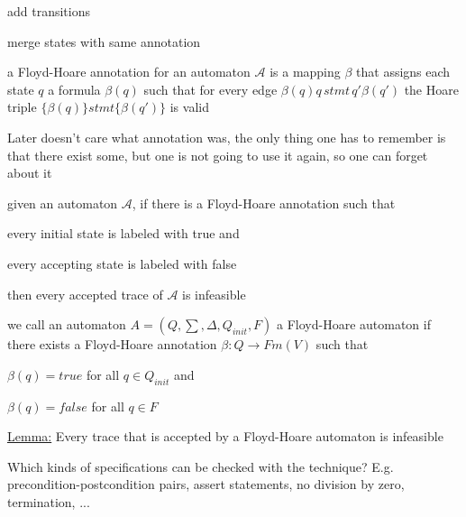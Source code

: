 \documentclass[a4paper]{article}
\begin{document}
\begin{minipage}[t]{0.16\linewidth}
\begin{betterlist}
{{\begin{betterlist}
\begin{enumerate}
					\end{enumerate}
					\begin{betterlist}
						\item a \alert{Floyd-Hoare annotation} for an automaton $\mathcal{A}$ is a mapping $\beta$ that assigns each state $q$ a formula $\beta(q)$ such that for every edge $\beta (q)q\, stmt\, q'\beta(q')$ the Hoare triple $\{\beta(q)\} stmt \{\beta(q′)\}$ is valid
						\begin{betterlist}
							\item Later doesn't care what annotation was, the only thing one has to remember is that there exist some, but one is not going to use it again, so one can forget about it
						\end{betterlist}
						\item given an automaton $\mathcal{A}$, if there is a Floyd-Hoare annotation such that
						\begin{betterlist}
							\item every initial state is labeled with true and
							\item every accepting state is labeled with false
						\end{betterlist}
						then every accepted trace of $\mathcal{A}$ is infeasible
						\item we call an automaton $A = (Q, \sum , \Delta , Q_{init}, F)$ a \alert{Floyd-Hoare automaton} if there exists a Floyd-Hoare annotation $\beta  : Q \rightarrow Fm(V)$ such that
						\begin{betterlist}
							\item $\beta(q) = true$ for all $q \in Q_{init}$ and
							\item $\beta(q) = false$ for all $q \in F$
						\end{betterlist}
						\item \underline{Lemma:} Every trace that is accepted by a Floyd-Hoare automaton is infeasible
					\end{betterlist}
				\end{betterlist}
			}}
		\item Which kinds of specifications can be checked with the technique? E.g. precondition-postcondition pairs, assert statements, no division by zero, termination, ...


\end{betterlist}
\end{minipage}
\end{document}
